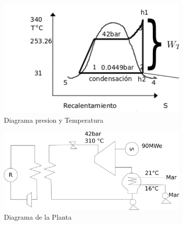 \documentclass[]{article}
\begin{document}
       
		
		
		
		
		
		
		

\begin{figure}
	\centering
	\includegraphics[width=0.85\textwidth]{SobrecalentamientoPlanta}
	\caption{Diagrama presion y Temperatura}
	\label{fig:diagPresionTemp}
\end{figure}

\begin{figure}[h!]
	\centering
	\includegraphics[width=0.85\textwidth]{diagrama.png}
	\caption{Diagrama de la Planta}
	\label{fig:diag}
\end{figure}
\end{document}
